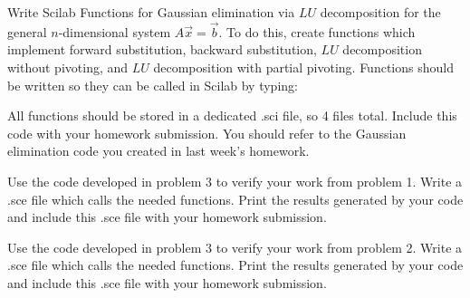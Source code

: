 \documentclass[addpoints, 11pt]{exam}
\begin{document}
\begin{questions}

\question Write Scilab Functions for Gaussian elimination via $LU$ decomposition for the general $n$-dimensional system $A\vec{x}=\vec{b}$. To do this, create functions which implement forward substitution, backward substitution, $LU$ decomposition without pivoting, and $LU$ decomposition with partial pivoting. Functions should be written so they can be called in Scilab by typing:
All functions should be stored in a dedicated .sci file, so 4 files total. Include this code with your homework submission. You should refer to the Gaussian elimination code you created in last week's homework.

\question Use the code developed in problem 3 to verify your work from problem 1. Write a .sce file which calls the needed functions. Print the results generated by your code and include this .sce file with your homework submission.

\question Use the code developed in problem 3 to verify your work from problem 2. Write a .sce file which calls the needed functions. Print the results generated by your code and include this .sce file with your homework submission.


\end{questions}
\end{document}
